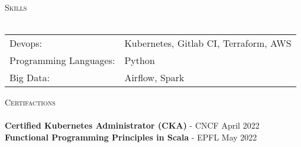 \documentclass[a4paper]{article}
\newcommand{\lineunder} {
    \vspace*{-8pt} \\
    \hspace*{-18pt} \hrulefill \\
}
\newcommand{\header} [1] {
    {\hspace*{-18pt}\vspace*{6pt} \textsc{#1}}
    \vspace*{-6pt} \lineunder
}
\begin{document}
\header{Skills}
\begin{tabular}{ l l }
	Devops:                & Kubernetes, Gitlab CI, Terraform, AWS \\
	Programming Languages: & Python                                \\
	Big Data:              & Airflow, Spark                        \\
\end{tabular}
\vspace{3mm}



\header{Certifactions}
\textbf{Certified Kubernetes Administrator (CKA)} - CNCF \hfill April 2022\\
\vspace*{1mm}
\textbf{Functional Programming Principles in Scala} - EPFL \hfill May 2022\\
\vspace*{1mm}

\ 
\end{document}
